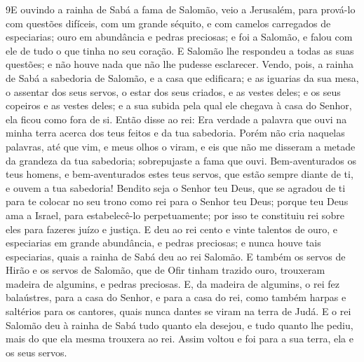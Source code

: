\lettrine{9} E ouvindo a rainha de Sabá a fama de Salomão,
veio a Jerusalém, para prová-lo com questões difíceis, com um grande
séquito, e com camelos carregados de especiarias; ouro em abundância
e pedras preciosas; e foi a Salomão, e falou com ele de tudo o que
tinha no seu coração. E Salomão lhe respondeu a todas as suas
questões; e não houve nada que não lhe pudesse esclarecer.
Vendo, pois, a rainha de Sabá a sabedoria de Salomão, e a casa
que edificara; e as iguarias da sua mesa, o assentar dos seus
servos, o estar dos seus criados, e as vestes deles; e os seus
copeiros e as vestes deles; e a sua subida pela qual ele chegava à
casa do Senhor, ela ficou como fora de si. Então disse ao rei:
Era verdade a palavra que ouvi na minha terra acerca dos teus feitos
e da tua sabedoria. Porém não cria naquelas palavras, até que
vim, e meus olhos o viram, e eis que não me disseram a metade da
grandeza da tua sabedoria; sobrepujaste a fama que ouvi.
Bem-aventurados os teus homens, e bem-aventurados estes teus
servos, que estão sempre diante de ti, e ouvem a tua sabedoria!
Bendito seja o Senhor teu Deus, que se agradou de ti para te
colocar no seu trono como rei para o Senhor teu Deus; porque teu
Deus ama a Israel, para estabelecê-lo perpetuamente; por isso te
constituiu rei sobre eles para fazeres juízo e justiça. E deu ao
rei cento e vinte talentos de ouro, e especiarias em grande
abundância, e pedras preciosas; e nunca houve tais especiarias,
quais a rainha de Sabá deu ao rei Salomão. E também os servos
de Hirão e os servos de Salomão, que de Ofir tinham trazido ouro,
trouxeram madeira de algumins, e pedras preciosas. E, da
madeira de algumins, o rei fez balaústres, para a casa do Senhor, e
para a casa do rei, como também harpas e saltérios para os cantores,
quais nunca dantes se viram na terra de Judá. E o rei Salomão
deu à rainha de Sabá tudo quanto ela desejou, e tudo quanto lhe
pediu, mais do que ela mesma trouxera ao rei. Assim voltou e foi
para a sua terra, ela e os seus servos.


